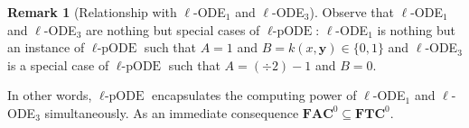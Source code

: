 \documentclass[11pt, oneside]{article}
\newcommand{\longv}[1]{}
\newcommand{\ACDL}{\mathbb{ACDL}}
\newcommand{\fun}[1]{\mathsf{#1}}
\newcommand{\sB}{B}
\newcommand{\sA}{A}
\newcommand{\NC}{\mathbf{FNC}}
\newcommand{\AC}{\mathbf{FAC}}
\newcommand{\TC}{\mathbf{FTC}}
\newcommand{\tu}[1]{\mathbf{#1}}
\newtheorem{prop}{Proposition}
\theoremstyle{definition}
\newtheorem{remark}{Remark}
\newcommand{\pODE}{\ell\text{-pODE}}
\begin{document}
\begin{toappendix}


\begin{remark}[Relationship with $\ell$-ODE$_1$ and $\ell$-ODE$_3$]\label{remark:pODE}
    Observe that $\ell$-ODE$_1$ and $\ell$-ODE$_3$ are nothing but special cases of $\pODE$:
    $\ell$-ODE$_1$ is nothing but an instance of $\pODE$ such that $A=1$ and $B=k(x, \tu y)\in \{0,1\}$ and $\ell$-ODE$_3$ is a special case of $\pODE$ such that $A=(\div 2) -1$ and $B=0$. 
\end{remark}
\noindent
In other words, $\pODE$ encapsulates the computing power of $\ell$-ODE$_1$ and $\ell$-ODE$_3$ simultaneously.
As an immediate consequence $\AC^0 \subseteq \TC^0$.


\longv{
\begin{remark}[Generalized $\pODE$ in $\NC^1$]
    Actually, we can generalize this schema so that $\sA$ and $\sB$ are expressions defined by any $\AC^0$ functions and, since $f(x, \tu y)$ does not occur in them, even bounded sums is allowed.
\end{remark}
}


\end{toappendix}
\end{document}
